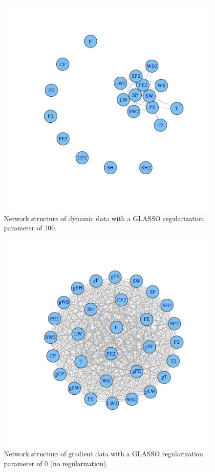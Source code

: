 \documentclass{article}
\begin{document}
\begin{figure}
\includegraphics[width=0.9\columnwidth]{images/dynamic_100.png}
\caption{Network structure of dynamic data with a GLASSO regularization parameter of 100.}
\label{fig:dynamic_100}
\end{figure}

\begin{figure}
\includegraphics[width=0.9\columnwidth]{images/grad_0.png}
\caption{Network structure of gradient data with a GLASSO regularization parameter of 0 (no regularization).}
\label{fig:grad_0}
\end{figure}
\end{document}
